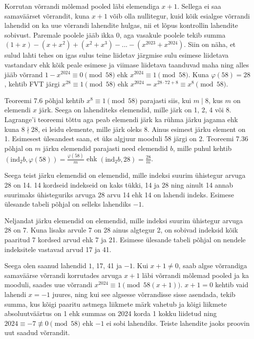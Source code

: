 \documentclass[a4paper, 10pt]{article}
\begin{document}
\bigskip
Korrutan võrrandi mõlemad pooled läbi elemendiga $x+1$. Sellega ei saa samaväärset võrrandit, kuna $x+1$ võib olla nullitegur, kuid kõik esialgse võrrandi lahendid on ka uue võrrandi lahendite hulgas, nii et lõpus kontrollin lahendite sobivust. Paremale poolele jääb ikka 0, aga vasakule poolele tekib summa $(1+x)-(x+x^2)+(x^2+x^3)-...-(x^{2023}+x^{2024})$. Siin on näha, et sulud lahti tehes on igas sulus teine liidetav järgmise sulu esimese liidetava vastandarv ehk kõik peale esimese ja viimase liidetava taanduvad maha ning alles jääb võrrand $1-x^{2024}\equiv0\pmod{58}$ ehk $x^{2024}\equiv1\pmod{58}$. Kuna $\varphi(58)=28$, kehtib FVT järgi $x^{28}\equiv1\pmod{58}$ ehk $x^{2024}=x^{28\cdot72+8}\equiv x^8\pmod{58}$.

Teoreemi 7.6 põhjal kehtib $x^8\equiv1\pmod{58}$ parajasti siis, kui $m\mid 8$, kus $m$ on elemendi $x$ järk. Seega on lahenditeks elemendid, mille järk on 1, 2, 4 või 8. Lagrange'i teoreemi tõttu aga peab elemendi järk ka rühma järku jagama ehk kuna $8\nmid28$, ei leidu elemente, mille järk oleks 8. Ainus esimest järku element on 1. Esimesest ülesandest saan, et üks algjuur mooduli 58 järgi on 2. Teoreemi 7.36 põhjal on $m$ järku elemendid parajasti need elemendid $b$, mille puhul kehtib $(\text{ind}_2b,\varphi(58))=\frac{\varphi(58)}{m}$ ehk $(\text{ind}_2b,28)=\frac{28}{m}$.

Seega teist järku elemendid on elemendid, mille indeksi suurim ühistegur arvuga 28 on 14. 14 kordseid indekseid on kaks tükki, 14 ja 28 ning ainult 14 annab suurimaks ühisteguriks arvuga 28 arvu 14 ehk 14 on lahendi indeks. Esimese ülesande tabeli põhjal on selleks lahendiks $-1$.

Neljandat järku elemendid on elemendid, mille indeksi suurim ühistegur arvuga 28 on 7. Kuna lisaks arvule 7 on 28 ainus algtegur 2, on sobivad indeksid kõik paaritud 7 kordsed arvud ehk 7 ja 21. Esimese ülesande tabeli põhjal on nendele indeksitele vastavad arvud 17 ja 41.

Seega olen saanud lahendid $1$, 17, 41 ja $-1$. Kui $x+1\not=0$, saab algse võrrandiga samaväärse võrrandi korrutades arvuga $x+1$ läbi võrrandi mõlemad pooled ja ka mooduli, saades uue võrrandi $x^{2024}\equiv1\pmod{58(x+1)}$. $x+1=0$ kehtib vaid lahendi $x=-1$ juures, ning kui see algsesse võrrandisse sisse asendada, tekib summa, kus kõigi paaritu astmega liikmete märk vahetub ja kõigi liikmete absoluutväärtus on 1 ehk summas on 2024 korda 1 kokku liidetud ning $2024\equiv-7\not\equiv0\pmod{58}$ ehk $-1$ ei sobi lahendiks. Teiste lahendite jaoks proovin uut saadud võrrandit.
\end{document}
